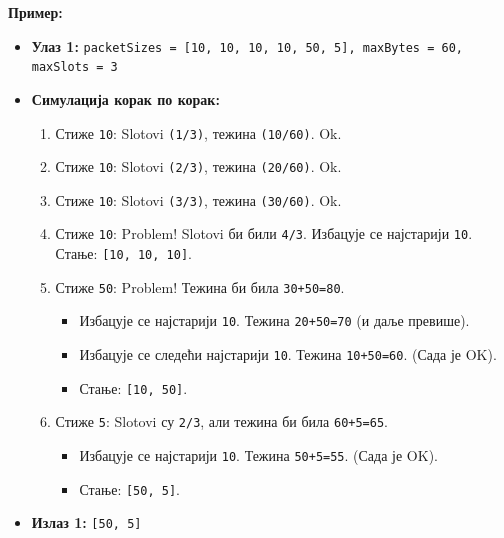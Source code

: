 \textbf{Пример:}
\begin{itemize}
	\item \textbf{Улаз 1:} \texttt{packetSizes = [10, 10, 10, 10, 50, 5], maxBytes = 60, maxSlots = 3}
	\item \textbf{Симулација корак по корак:}
	\begin{enumerate}
		\item Стиже \texttt{10}: Slotovi \texttt{(1/3)}, тежина \texttt{(10/60)}. Ok.
		\item Стиже \texttt{10}: Slotovi \texttt{(2/3)}, тежина \texttt{(20/60)}. Ok.
		\item Стиже \texttt{10}: Slotovi \texttt{(3/3)}, тежина \texttt{(30/60)}. Ok.
		\item Стиже \texttt{10}: Problem! Slotovi би били \texttt{4/3}. Избацује се најстарији \texttt{10}. Стање: \texttt{[10, 10, 10]}.
		\item Стиже \texttt{50}: Problem! Тежина би била \texttt{30+50=80}.
		\begin{itemize}
			\item Избацује се најстарији \texttt{10}. Тежина \texttt{20+50=70} (и даље превише).
			\item Избацује се следећи најстарији \texttt{10}. Тежина \texttt{10+50=60}. (Сада је OK).
			\item Стање: \texttt{[10, 50]}.
		\end{itemize}
		\item Стиже \texttt{5}: Slotovi су \texttt{2/3}, али тежина би била \texttt{60+5=65}.
		\begin{itemize}
			\item Избацује се најстарији \texttt{10}. Тежина \texttt{50+5=55}. (Сада је OK).
			\item Стање: \texttt{[50, 5]}.
		\end{itemize}
	\end{enumerate}
	\item \textbf{Излаз 1:} \texttt{[50, 5]}
\end{itemize}

